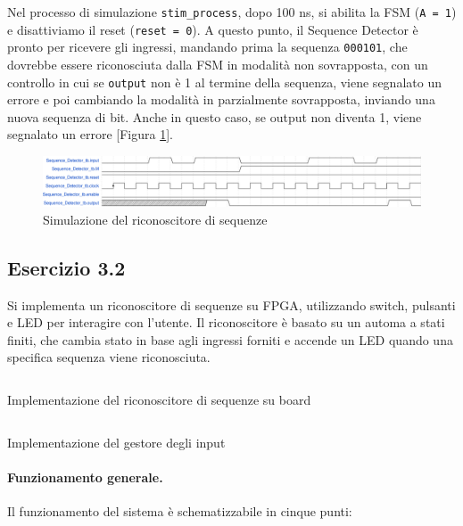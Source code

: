 Nel processo di simulazione \texttt{stim\_process}, dopo 100 ns, si abilita la FSM (\texttt{A = 1}) e disattiviamo il reset (\texttt{reset = 0}). A questo punto, il Sequence Detector è pronto per ricevere gli ingressi, mandando prima la sequenza \texttt{000101}, che dovrebbe essere riconosciuta dalla FSM in modalità non sovrapposta, con un controllo in cui se \texttt{output} non è 1 al termine della sequenza, viene segnalato un errore e poi cambiando la modalità in parzialmente sovrapposta, inviando una nuova sequenza di bit. Anche in questo caso, se output non diventa 1, viene segnalato un errore [Figura \ref{fig:sequence_detector_tb}].

\begin{figure}[h]
    \centering
    \includegraphics[width=\linewidth]{img/sequence_detector_tb.pdf}
    \caption{Simulazione del riconoscitore di sequenze}
    \label{fig:sequence_detector_tb}
\end{figure}

\subsection{Esercizio 3.2}
Si implementa un riconoscitore di sequenze su FPGA, utilizzando switch, pulsanti e LED per interagire con l'utente. Il riconoscitore è basato su un automa a stati finiti, che cambia stato in base agli ingressi forniti e accende un LED quando una specifica sequenza viene riconosciuta.

\begin{code}
    \inputminted{vhdl}{vhdl/Sequence_Detector_onboard.vhd}
    \caption{Implementazione del riconoscitore di sequenze su board}
    \label{cod:sequence_detector_onboard}
\end{code}

\begin{code}
    \inputminted{vhdl}{vhdl/sequence_Detector_Input_Manager.vhd}
    \caption{Implementazione del gestore degli input}
    \label{cod:sequence_detector_input_manager}
\end{code}

\paragraph{Funzionamento generale.}
Il funzionamento del sistema è schematizzabile in cinque punti:

